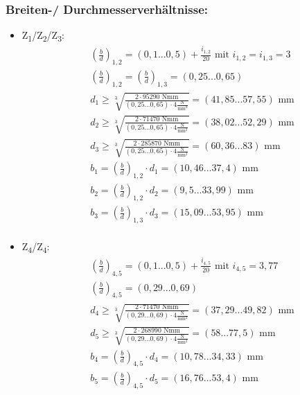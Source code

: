 \subsubsection{Breiten-/ Durchmesserverhältnisse:}
\begin{itemize}
\item {Z\textsubscript{1}/Z\textsubscript{2}/Z\textsubscript{3}:}
\begin{align*}
	& \left(\frac{b}{d} \right) _{1,2} = (0,1...0,5) + \frac{i_{1,2}}{20} \text{ mit } i_{1,2} = i_{1,3}= 3 \\
	&\left(\frac{b}{d} \right) _{1,2}= \left(\frac{b}{d} \right) _{1,3} = (0,25...0,65) \\
	&d_1 \ge \sqrt[3]{\frac{2 \cdot 95290 \text{ Nmm}}{(0,25...0,65) \cdot  4 \frac{\text{N}}{\text{mm}^2}}}= (41,85...57,55) \text{ mm}\\
	&d_2 \ge \sqrt[3]{\frac{2 \cdot 71470 \text{ Nmm}}{(0,25...0,65) \cdot  4 \frac{\text{N}}{\text{mm}^2}}}= (38,02...52,29) \text{ mm}  \\
	&d_3 \ge \sqrt[3]{\frac{2 \cdot 285870 \text{ Nmm}}{(0,25...0,65) \cdot  4 \frac{\text{N}}{\text{mm}^2}}}= (60,36...83) \text{ mm}\\
	&b_1= \left(\frac{b}{d} \right) _{1,2}  \cdot d_1 = (10,46...37,4) \text{ mm}  \\
	&b_2= \left(\frac{b}{d} \right) _{1,2}  \cdot d_2 = (9,5...33,99) \text{ mm}  \\
	&b_3= \left(\frac{b}{d} \right) _{1,3}  \cdot d_3 = (15,09...53,95) \text{ mm}  \\
\end{align*}
\item {Z\textsubscript{4}/Z\textsubscript{4}:}
\begin{align*}
	& \left(\frac{b}{d} \right) _{4,5} = (0,1...0,5) + \frac{i_{4,5}}{20} \text{ mit } i_{4,5} =  3,77 \\
	&\left(\frac{b}{d} \right) _{4,5}=  (0,29...0,69) \\
	&d_4 \ge \sqrt[3]{\frac{2 \cdot 71470 \text{ Nmm}}{(0,29...0,69) \cdot  4 \frac{\text{N}}{\text{mm}^2}}}= (37,29...49,82) \text{ mm}\\
	&d_5 \ge \sqrt[3]{\frac{2 \cdot 268990 \text{ Nmm}}{(0,29...0,69) \cdot  4 \frac{\text{N}}{\text{mm}^2}}}= (58...77,5) \text{ mm}  \\
	&b_4= \left(\frac{b}{d} \right) _{4,5}  \cdot d_4 = (10,78...34,33) \text{ mm}  \\
	&b_5= \left(\frac{b}{d} \right) _{4,5}  \cdot d_5 = (16,76...53,4) \text{ mm}  \\

\end{align*}
\end{itemize}
